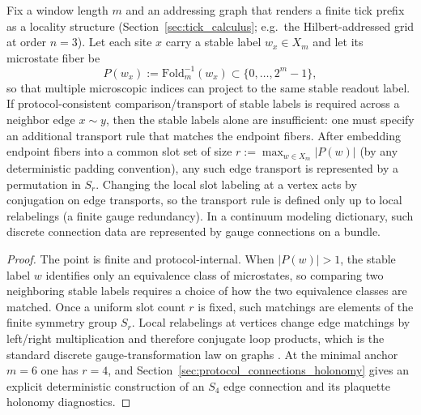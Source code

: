 \begin{proposition}
\label{prop:gauge_compensation}
Fix a window length $m$ and an addressing graph that renders a finite tick prefix as a locality structure (Section~\ref{sec:tick_calculus}; e.g.\ the Hilbert-addressed grid at order $n=3$).
Let each site $x$ carry a stable label $w_x\in X_m$ and let its microstate fiber be
\[
P(w_x):=\mathrm{Fold}_m^{-1}(w_x)\subset\{0,\dots,2^m-1\},
\]
so that multiple microscopic indices can project to the same stable readout label.
If protocol-consistent comparison/transport of stable labels is required across a neighbor edge $x\sim y$, then the stable labels alone are insufficient: one must specify an additional transport rule that matches the endpoint fibers.
After embedding endpoint fibers into a common slot set of size $r:=\max_{w\in X_m}|P(w)|$ (by any deterministic padding convention), any such edge transport is represented by a permutation in $S_r$.
Changing the local slot labeling at a vertex acts by conjugation on edge transports, so the transport rule is defined only up to local relabelings (a finite gauge redundancy).
In a continuum modeling dictionary, such discrete connection data are represented by gauge connections on a bundle.
\end{proposition}
\begin{proof}
The point is finite and protocol-internal.
When $|P(w)|>1$, the stable label $w$ identifies only an equivalence class of microstates, so comparing two neighboring stable labels requires a choice of how the two equivalence classes are matched.
Once a uniform slot count $r$ is fixed, such matchings are elements of the finite symmetry group $S_r$.
Local relabelings at vertices change edge matchings by left/right multiplication and therefore conjugate loop products, which is the standard discrete gauge-transformation law on graphs \cite{Wilson1974,Rothe2012}.
At the minimal anchor $m=6$ one has $r=4$, and Section~\ref{sec:protocol_connections_holonomy} gives an explicit deterministic construction of an $S_4$ edge connection and its plaquette holonomy diagnostics.
\end{proof}

